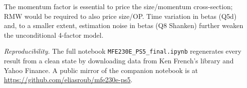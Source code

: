 \documentclass[11pt,letterpaper]{article}
\begin{document}
The momentum factor is essential to price the size/momentum cross-section; RMW would be
required to also price size/OP. Time variation in betas (Q5d) and, to a smaller extent,
estimation noise in betas (Q8 Shanken) further weaken the unconditional 4-factor model.

\bigskip
\noindent\textit{Reproducibility.} The full notebook
\texttt{MFE230E\_PS5\_final.ipynb} regenerates every result from a clean state by
downloading data from Ken French's library and Yahoo Finance. A public mirror of the
companion notebook is at \url{https://github.com/eliasroub/mfe230e-ps5}.
\end{document}
